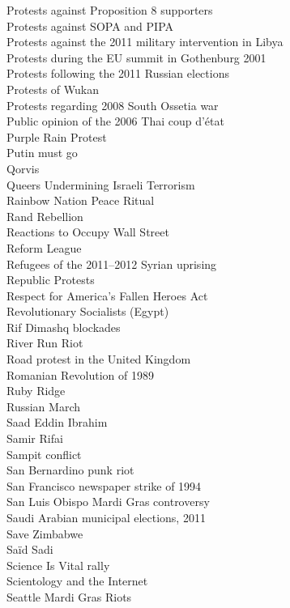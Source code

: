 Protests against Proposition 8 supporters\\
Protests against SOPA and PIPA\\
Protests against the 2011 military intervention in Libya\\
Protests during the EU summit in Gothenburg 2001\\
Protests following the 2011 Russian elections\\
Protests of Wukan\\
Protests regarding 2008 South Ossetia war\\
Public opinion of the 2006 Thai coup d'état\\
Purple Rain Protest\\
Putin must go\\
Qorvis\\
Queers Undermining Israeli Terrorism\\
Rainbow Nation Peace Ritual\\
Rand Rebellion\\
Reactions to Occupy Wall Street\\
Reform League\\
Refugees of the 2011–2012 Syrian uprising\\
Republic Protests\\
Respect for America's Fallen Heroes Act\\
Revolutionary Socialists (Egypt)\\
Rif Dimashq blockades\\
River Run Riot\\
Road protest in the United Kingdom\\
Romanian Revolution of 1989\\
Ruby Ridge\\
Russian March\\
Saad Eddin Ibrahim\\
Samir Rifai\\
Sampit conflict\\
San Bernardino punk riot\\
San Francisco newspaper strike of 1994\\
San Luis Obispo Mardi Gras controversy\\
Saudi Arabian municipal elections, 2011\\
Save Zimbabwe\\
Saïd Sadi\\
Science Is Vital rally\\
Scientology and the Internet\\
Seattle Mardi Gras Riots\\
